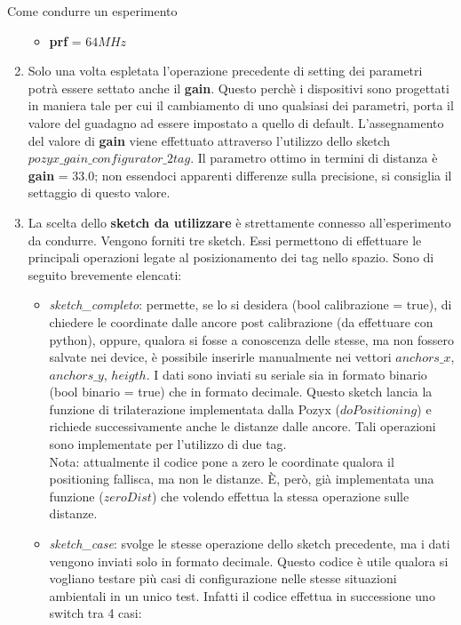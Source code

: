 \documentclass[12pt]{report}
\begin{document}
\begin{section}{Come condurre un esperimento}
\begin{enumerate}
\begin{itemize}
							\item \textbf{prf} = $64MHz$
						\end{itemize}
				\item Solo una volta espletata l'operazione precedente di setting dei parametri potrà essere settato anche il \textbf{gain}. Questo perchè i dispositivi sono progettati in maniera tale per cui il cambiamento di uno qualsiasi dei parametri, porta il valore del guadagno ad essere impostato a quello di default. 									L'assegnamento del valore di \textbf{gain} viene effettuato attraverso l'utilizzo dello sketch $pozyx\_gain\_configurator\_2tag$. Il parametro ottimo in termini di distanza è \textbf{gain} = 33.0; non essendoci apparenti differenze sulla precisione, si consiglia il settaggio di questo valore.
				\item La scelta dello \textbf{sketch da utilizzare} è strettamente connesso all'esperimento da condurre. Vengono forniti tre sketch. Essi permettono di effettuare le principali operazioni legate al posizionamento dei tag nello spazio. Sono di seguito brevemente elencati:
						\begin{itemize}
							\item \textit{sketch\_completo}: permette, se lo si desidera (bool calibrazione = true), di chiedere le coordinate dalle ancore post calibrazione (da effettuare con python), oppure, qualora si fosse a conoscenza delle stesse, ma non fossero salvate nei device, è possibile inserirle manualmente nei 												vettori $anchors\_x$, $anchors\_y$, $heigth$. I dati sono inviati su seriale sia in formato binario (bool binario = true) che in formato decimale. Questo sketch lancia la funzione di trilaterazione implementata dalla Pozyx ($doPositioning$) e richiede successivamente anche le distanze dalle ancore. 										Tali operazioni sono implementate per l'utilizzo di due tag. \\Nota: attualmente il codice pone a zero le coordinate qualora il positioning fallisca, ma non le distanze. È, però, già implementata una funzione ($zeroDist$) che volendo effettua la stessa operazione sulle distanze. 
							\item \textit{sketch\_case}: svolge le stesse operazione dello sketch precedente, ma i dati vengono inviati solo in formato decimale. Questo codice è utile qualora si vogliano testare più casi di configurazione nelle stesse situazioni ambientali in un unico test. Infatti il codice effettua in successione uno 											switch tra 4 casi:
									\begin{itemize}

\end{itemize}
\end{itemize}
\end{enumerate}
\end{section}
\end{document}
